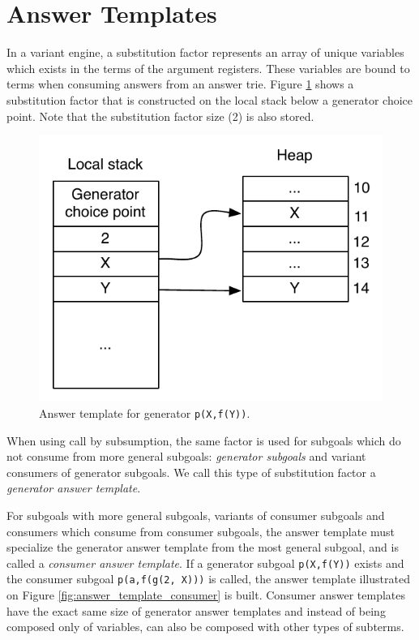 \section{Answer Templates}

In a variant engine, a substitution factor
represents an array of unique variables which exists in the terms of the argument registers.
These variables are bound to terms when consuming answers from an answer trie.
Figure \ref{fig:answer_template_generator} shows a substitution factor that is constructed
on the local stack below a generator choice point.
Note that the substitution factor size (2) is also stored.

\begin{figure}[ht]
  \centering
    \includegraphics[scale=0.6]{answer_template_generator.pdf}
  \caption{Answer template for generator \texttt{p(X,f(Y))}.}
  \label{fig:answer_template_generator}
\end{figure}

When using call by subsumption, the same factor is used for
subgoals which do not consume from more general subgoals: \textit{generator subgoals}
and variant consumers of generator subgoals.
We call this type of substitution factor a \textit{generator answer template}.

For subgoals with more general subgoals, variants of consumer subgoals and consumers
which consume from consumer subgoals, the answer template must specialize the generator answer template
from the most general subgoal, and is called a \textit{consumer answer template}.
If a generator subgoal \texttt{p(X,f(Y))} exists and the consumer subgoal \texttt{p(a,f(g(2, X)))}
is called, the answer template illustrated on Figure \ref{fig:answer_template_consumer} is built.
Consumer answer templates have the exact same size of generator answer templates
and instead of being composed only of variables, can also be composed with other types of subterms.

